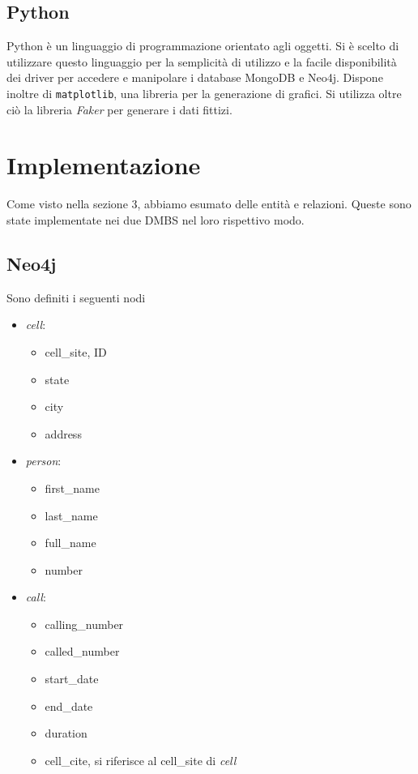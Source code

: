     \subsection{Python}
    Python è un linguaggio di programmazione orientato agli oggetti. Si è scelto di utilizzare questo
    linguaggio per la semplicità di utilizzo e la facile disponibilità dei driver per accedere e manipolare
    i database MongoDB e Neo4j. Dispone inoltre di \texttt{matplotlib}, una libreria per
    la generazione di grafici. Si utilizza oltre ciò la libreria \textit{Faker} per generare i dati fittizi.

\section{Implementazione}
    Come visto nella sezione 3, abbiamo esumato delle entità e relazioni. Queste sono state implementate
    nei due DMBS nel loro rispettivo modo.

    \subsection{Neo4j}

    Sono definiti i seguenti nodi
    \begin{itemize}
        \item \textit{cell}:
            \begin{itemize}
                \item cell\_site, ID
                \item state
                \item city
                \item address
            \end{itemize}

        \item \textit{person}:
            \begin{itemize}
                \item first\_name
                \item last\_name
                \item full\_name
                \item number
            \end{itemize}

        \item \textit{call}:
            \begin{itemize}
                \item calling\_number
                \item called\_number
                \item start\_date
                \item end\_date
                \item duration
                \item cell\_cite, si riferisce al cell\_site di \textit{cell}
            \end{itemize}
    \end{itemize}

